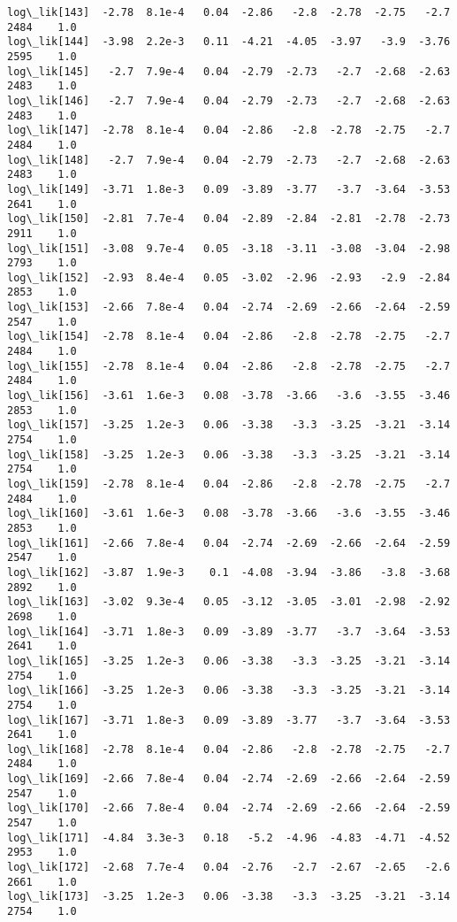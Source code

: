 \documentclass[11pt]{article}
\begin{document}
\begin{Verbatim}[commandchars=\\\{\}]
log\_lik[143]  -2.78  8.1e-4   0.04  -2.86   -2.8  -2.78  -2.75   -2.7   2484    1.0
log\_lik[144]  -3.98  2.2e-3   0.11  -4.21  -4.05  -3.97   -3.9  -3.76   2595    1.0
log\_lik[145]   -2.7  7.9e-4   0.04  -2.79  -2.73   -2.7  -2.68  -2.63   2483    1.0
log\_lik[146]   -2.7  7.9e-4   0.04  -2.79  -2.73   -2.7  -2.68  -2.63   2483    1.0
log\_lik[147]  -2.78  8.1e-4   0.04  -2.86   -2.8  -2.78  -2.75   -2.7   2484    1.0
log\_lik[148]   -2.7  7.9e-4   0.04  -2.79  -2.73   -2.7  -2.68  -2.63   2483    1.0
log\_lik[149]  -3.71  1.8e-3   0.09  -3.89  -3.77   -3.7  -3.64  -3.53   2641    1.0
log\_lik[150]  -2.81  7.7e-4   0.04  -2.89  -2.84  -2.81  -2.78  -2.73   2911    1.0
log\_lik[151]  -3.08  9.7e-4   0.05  -3.18  -3.11  -3.08  -3.04  -2.98   2793    1.0
log\_lik[152]  -2.93  8.4e-4   0.05  -3.02  -2.96  -2.93   -2.9  -2.84   2853    1.0
log\_lik[153]  -2.66  7.8e-4   0.04  -2.74  -2.69  -2.66  -2.64  -2.59   2547    1.0
log\_lik[154]  -2.78  8.1e-4   0.04  -2.86   -2.8  -2.78  -2.75   -2.7   2484    1.0
log\_lik[155]  -2.78  8.1e-4   0.04  -2.86   -2.8  -2.78  -2.75   -2.7   2484    1.0
log\_lik[156]  -3.61  1.6e-3   0.08  -3.78  -3.66   -3.6  -3.55  -3.46   2853    1.0
log\_lik[157]  -3.25  1.2e-3   0.06  -3.38   -3.3  -3.25  -3.21  -3.14   2754    1.0
log\_lik[158]  -3.25  1.2e-3   0.06  -3.38   -3.3  -3.25  -3.21  -3.14   2754    1.0
log\_lik[159]  -2.78  8.1e-4   0.04  -2.86   -2.8  -2.78  -2.75   -2.7   2484    1.0
log\_lik[160]  -3.61  1.6e-3   0.08  -3.78  -3.66   -3.6  -3.55  -3.46   2853    1.0
log\_lik[161]  -2.66  7.8e-4   0.04  -2.74  -2.69  -2.66  -2.64  -2.59   2547    1.0
log\_lik[162]  -3.87  1.9e-3    0.1  -4.08  -3.94  -3.86   -3.8  -3.68   2892    1.0
log\_lik[163]  -3.02  9.3e-4   0.05  -3.12  -3.05  -3.01  -2.98  -2.92   2698    1.0
log\_lik[164]  -3.71  1.8e-3   0.09  -3.89  -3.77   -3.7  -3.64  -3.53   2641    1.0
log\_lik[165]  -3.25  1.2e-3   0.06  -3.38   -3.3  -3.25  -3.21  -3.14   2754    1.0
log\_lik[166]  -3.25  1.2e-3   0.06  -3.38   -3.3  -3.25  -3.21  -3.14   2754    1.0
log\_lik[167]  -3.71  1.8e-3   0.09  -3.89  -3.77   -3.7  -3.64  -3.53   2641    1.0
log\_lik[168]  -2.78  8.1e-4   0.04  -2.86   -2.8  -2.78  -2.75   -2.7   2484    1.0
log\_lik[169]  -2.66  7.8e-4   0.04  -2.74  -2.69  -2.66  -2.64  -2.59   2547    1.0
log\_lik[170]  -2.66  7.8e-4   0.04  -2.74  -2.69  -2.66  -2.64  -2.59   2547    1.0
log\_lik[171]  -4.84  3.3e-3   0.18   -5.2  -4.96  -4.83  -4.71  -4.52   2953    1.0
log\_lik[172]  -2.68  7.7e-4   0.04  -2.76   -2.7  -2.67  -2.65   -2.6   2661    1.0
log\_lik[173]  -3.25  1.2e-3   0.06  -3.38   -3.3  -3.25  -3.21  -3.14   2754    1.0

\end{Verbatim}
\end{document}
